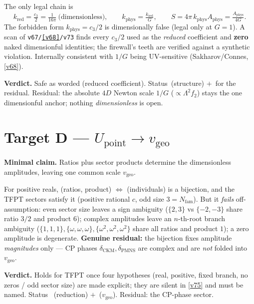 \documentclass[11pt,a4paper]{article}
\newcommand{\cthree}{c_3}
\newcommand{\vgeo}{v_{\mathrm{geo}}}
\newcommand{\Nfam}{N_{\mathrm{fam}}}
\begin{document}
\begin{winbox}
The only legal chain is
\[
  k_{\mathrm{red}}=\tfrac{\cthree}{2}=\tfrac{1}{16\pi}\ \text{(dimensionless)},\qquad
  k_{\mathrm{phys}}=\tfrac{k_{\mathrm{red}}}{G},\qquad
  S=4\pi\,k_{\mathrm{phys}}A_{\mathrm{phys}}=\tfrac{A_{\mathrm{phys}}}{4G}.
\]
The forbidden form $k_{\mathrm{phys}}=\cthree/2$ is dimensionally false (legal only at $G=1$). A
scan of \texttt{v67/\vref{v68}/v73} finds every $\cthree/2$ used as the \emph{reduced} coefficient and
\textbf{zero} naked dimensionful identities; the firewall's teeth are verified against a synthetic
violation. Internally consistent with $1/G$ being UV-sensitive (Sakharov/Connes, \vref{v68}).
\end{winbox}

\noindent\textbf{Verdict.} Safe as worded (reduced coefficient). Status \mE\,(structure) $+$ \mO\,for
the residual. Residual: the absolute $4D$ Newton scale $1/G$ ($\propto \Lambda^2 f_2$) stays the one
dimensionful anchor; nothing \emph{dimensionless} is open.

\section*{Target D --- $U_{\mathrm{point}}\to\vgeo$}\label{sec:D}
\noindent\textbf{Minimal claim.} Ratios plus sector products determine the dimensionless amplitudes,
leaving one common scale $\vgeo$.

\begin{keybox}
For positive reals, (ratios, product) $\Leftrightarrow$ (individuals) is a bijection, and the TFPT
sectors satisfy it (positive rational $c$, odd size $3=\Nfam$). But it \emph{fails} off-assumption:
even sector size leaves a sign ambiguity ($\{2,3\}$ vs $\{-2,-3\}$ share ratio $3/2$ and product
$6$); complex amplitudes leave an $n$-th-root branch ambiguity ($\{1,1,1\},\{\omega,\omega,\omega\},
\{\omega^2,\omega^2,\omega^2\}$ share all ratios and product $1$); a zero amplitude is degenerate.
\textbf{Genuine residual:} the bijection fixes amplitude \emph{magnitudes} only --- CP phases
$\delta_{\mathrm{CKM}},\delta_{\mathrm{PMNS}}$ are complex and are \emph{not} folded into $\vgeo$.
\end{keybox}

\noindent\textbf{Verdict.} Holds for TFPT once four hypotheses (real, positive, fixed branch, no
zeros / odd sector size) are made explicit; they are silent in \vref{v75} and must be named. Status \mE\,
(reduction) $+$ \mO\,($\vgeo$). Residual: the CP-phase sector.
\end{document}
